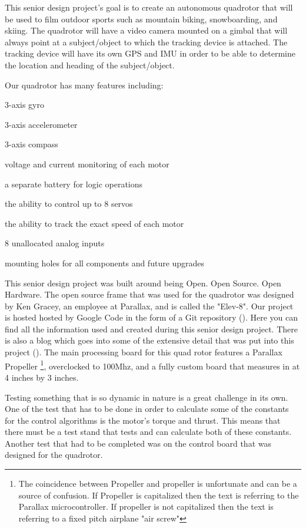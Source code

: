 \documentclass{article}
\numberwithin{equation}{section} %
\begin{document}
This senior design project's goal is to create an autonomous quadrotor that will be used to film outdoor sports such as mountain biking, snowboarding, and skiing. The quadrotor will have a video camera mounted on a gimbal that will always point at a subject/object to which the tracking device is attached. The tracking device will have its own GPS and IMU in order to be able to determine the location and heading of the subject/object.

Our quadrotor has many features including: 
\begin{list}{*}{}
	\item 3-axis gyro
	\item 3-axis accelerometer
	\item 3-axis compass
	\item voltage and current monitoring of each motor
	\item a separate battery for logic operations
	\item the ability to control up to 8 servos
	\item the ability to track the exact speed of each motor
	\item 8 unallocated analog inputs
	\item mounting holes for all components and future upgrades
\end{list}

This senior design project was built around being Open. Open Source. Open Hardware. The open source frame that was used for the quadrotor was designed by Ken Gracey, an employee at Parallax, and is called the "Elev-8". Our project is hosted hosted by Google Code in the form of a Git repository (\cite{anzhelka_code}). Here you can find all the information used and created during this senior design project. There is also a blog which goes into some of the extensive detail that was put into this project (\cite{anzhelka_blog}). The main processing board for this quad rotor features a Parallax Propeller \footnote{The coincidence between Propeller and propeller is unfortunate and can be a source of confusion. If Propeller is capitalized then the text is referring to the Parallax microcontroller. If propeller is not capitalized then the text is referring to a fixed pitch airplane "air screw"}, overclocked to 100Mhz, and a fully custom board that measures in at 4 inches by 3 inches.


Testing something that is so dynamic in nature is a great challenge in its own. One of the test that has to be done in order to calculate some of the constants for the control algorithms is the motor's torque and thrust. This means that there must be a test stand that tests and can calculate both of these constants. Another test that had to be completed was on the control board that was designed for the quadrotor.
\end{document}
